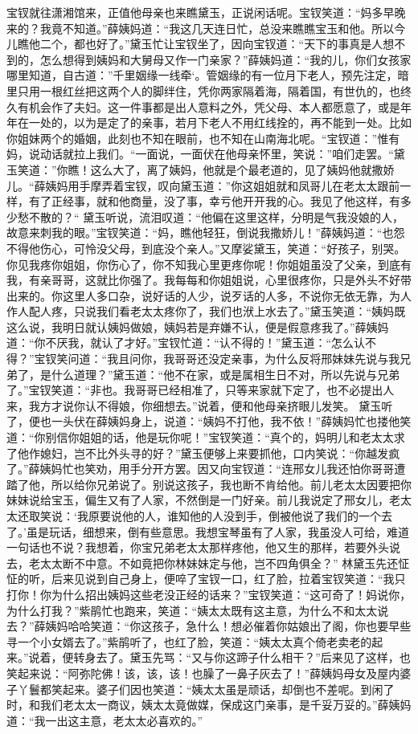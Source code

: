 \documentclass[12pt,oneside]{book}
\begin{document}
宝钗就往潇湘馆来，正值他母亲也来瞧黛玉，正说闲话呢。宝钗笑道：“妈多早晚来的？我竟不知道。”薛姨妈道：“我这几天连日忙，总没来瞧瞧宝玉和他。所以今儿瞧他二个，都也好了。”黛玉忙让宝钗坐了，因向宝钗道：“天下的事真是人想不到的，怎么想得到姨妈和大舅母又作一门亲家？”薛姨妈道：“我的儿，你们女孩家哪里知道，自古道：”千里姻缘一线牵‘。管姻缘的有一位月下老人，预先注定，暗里只用一根红丝把这两个人的脚绊住，凭你两家隔着海，隔着国，有世仇的，也终久有机会作了夫妇。这一件事都是出人意料之外，凭父母、本人都愿意了，或是年年在一处的，以为是定了的亲事，若月下老人不用红线拴的，再不能到一处。比如你姐妹两个的婚姻，此刻也不知在眼前，也不知在山南海北呢。“宝钗道：”惟有妈，说动话就拉上我们。“一面说，一面伏在他母亲怀里，笑说：”咱们走罢。“黛玉笑道：”你瞧！这么大了，离了姨妈，他就是个最老道的，见了姨妈他就撒娇儿。“薛姨妈用手摩弄着宝钗，叹向黛玉道：”你这姐姐就和凤哥儿在老太太跟前一样，有了正经事，就和他商量，没了事，幸亏他开开我的心。我见了他这样，有多少愁不散的？“
黛玉听说，流泪叹道：“他偏在这里这样，分明是气我没娘的人，故意来刺我的眼。”宝钗笑道：“妈，瞧他轻狂，倒说我撒娇儿！”薛姨妈道：“也怨不得他伤心，可怜没父母，到底没个亲人。”又摩娑黛玉，笑道：“好孩子，别哭。你见我疼你姐姐，你伤心了，你不知我心里更疼你呢！你姐姐虽没了父亲，到底有我，有亲哥哥，这就比你强了。我每每和你姐姐说，心里很疼你，只是外头不好带出来的。你这里人多口杂，说好话的人少，说歹话的人多，不说你无依无靠，为人作人配人疼，只说我们看老太太疼你了，我们也洑上水去了。”黛玉笑道：“姨妈既这么说，我明日就认姨妈做娘，姨妈若是弃嫌不认，便是假意疼我了。”薛姨妈道：“你不厌我，就认了才好。”宝钗忙道：“认不得的！”黛玉道：“怎么认不得？”宝钗笑问道：“我且问你，我哥哥还没定亲事，为什么反将邢妹妹先说与我兄弟了，是什么道理？”黛玉道：“他不在家，或是属相生日不对，所以先说与兄弟了。”宝钗笑道：“非也。我哥哥已经相准了，只等来家就下定了，也不必提出人来，我方才说你认不得娘，你细想去。”说着，便和他母亲挤眼儿发笑。
黛玉听了，便也一头伏在薛姨妈身上，说道：“姨妈不打他，我不依！”薛姨妈忙也搂他笑道：“你别信你姐姐的话，他是玩你呢！”宝钗笑道：“真个的，妈明儿和老太太求了他作媳妇，岂不比外头寻的好？”黛玉便够上来要抓他，口内笑说：“你越发疯了。”薛姨妈忙也笑劝，用手分开方罢。因又向宝钗道：“连邢女儿我还怕你哥哥遭踏了他，所以给你兄弟说了。别说这孩子，我也断不肯给他。前儿老太太因要把你妹妹说给宝玉，偏生又有了人家，不然倒是一门好亲。前儿我说定了邢女儿，老太太还取笑说：‘我原要说他的人，谁知他的人没到手，倒被他说了我们的一个去了。’虽是玩话，细想来，倒有些意思。我想宝琴虽有了人家，我虽没人可给，难道一句话也不说？我想着，你宝兄弟老太太那样疼他，他又生的那样，若要外头说去，老太太断不中意。不如竟把你林妹妹定与他，岂不四角俱全？”
林黛玉先还怔怔的听，后来见说到自己身上，便啐了宝钗一口，红了脸，拉着宝钗笑道：“我只打你！你为什么招出姨妈这些老没正经的话来？”宝钗笑道：“这可奇了！妈说你，为什么打我？”紫鹃忙也跑来，笑道：“姨太太既有这主意，为什么不和太太说去？”薛姨妈哈哈笑道：“你这孩子，急什么！想必催着你姑娘出了阁，你也要早些寻一个小女婿去了。”紫鹃听了，也红了脸，笑道：“姨太太真个倚老卖老的起来。”说着，便转身去了。黛玉先骂：“又与你这蹄子什么相干？”后来见了这样，也笑起来说：“阿弥陀佛！该，该，该！也臊了一鼻子灰去了！”薛姨妈母女及屋内婆子丫鬟都笑起来。婆子们因也笑道：“姨太太虽是顽话，却倒也不差呢。到闲了时，和我们老太太一商议，姨太太竟做媒，保成这门亲事，是千妥万妥的。”薛姨妈道：“我一出这主意，老太太必喜欢的。”
\end{document}
